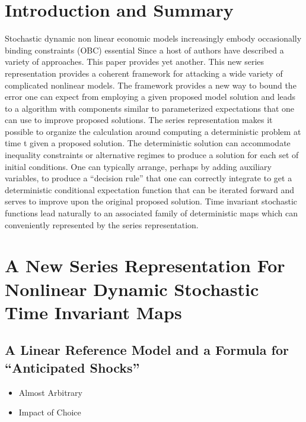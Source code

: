 \documentclass[12pt]{article}
\begin{document}
\section{Introduction and Summary}





Stochastic dynamic non linear economic
models increasingly embody  occasionally binding constraints (OBC) essential
Since \cite{Christiano2000} a host of
authors have described a variety of approaches. 
\cite{holden15:_exist_dsge,guerrieri15:_occbin,benigno09,hintermaier10,brumm10,nakov08,haefke98,nakata12,gordon11,billi11,Hintermaier2010,Guerrieri2015}
This paper provides yet another.  This new series representation provides  a coherent framework for attacking a wide variety of complicated nonlinear models.
The framework provides a new way to bound the error one can expect from
employing a given proposed model solution and leads to a
algorithm with  components similar to parameterized expectations that
one can use to improve proposed solutions. The series representation makes
it possible to organize the calculation around computing a deterministic
problem at time t given a proposed solution.  The deterministic solution
can accommodate inequality constraints or alternative regimes to produce a
solution for each set of initial conditions.  One can typically arrange,
perhaps by adding auxiliary variables, to produce a ``decision rule''
that one can correctly integrate to get a deterministic conditional
expectation function that can be iterated forward and serves to
improve upon the original proposed solution.
Time invariant stochastic functions 
lead naturally to an associated family of deterministic maps
which can conveniently represented by the series representation.





\section{A New Series Representation For Nonlinear Dynamic Stochastic Time Invariant Maps}
\label{sec:newseries}

\subsection{A Linear Reference Model and a Formula for  ``Anticipated Shocks''}
\label{sec:linref}
\begin{itemize}
\item Almost Arbitrary
\item Impact of Choice
\end{itemize}
\end{document}
